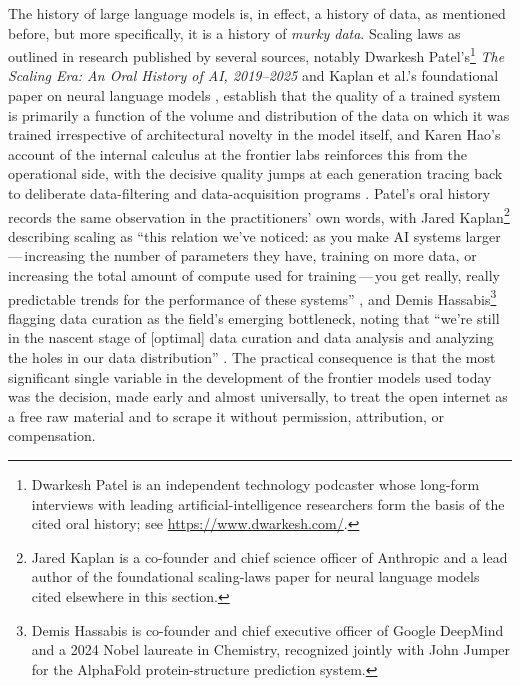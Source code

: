 \documentclass[10pt,a4paper,twocolumn]{article}
\begin{document}
The history of large language models is, in effect, a history of data, as mentioned before, but more specifically, it is a history of \emph{murky data}. Scaling laws as outlined in research published by several sources, notably Dwarkesh Patel's\footnote{Dwarkesh Patel is an independent technology podcaster whose long-form interviews with leading artificial-intelligence researchers form the basis of the cited oral history; see \url{https://www.dwarkesh.com/}.} \emph{The Scaling Era: An Oral History of AI, 2019--2025} \citep{patel2025scaling} and Kaplan et al.'s foundational paper on neural language models \citep{kaplan2020scaling}, establish that the quality of a trained system is primarily a function of the volume and distribution of the data on which it was trained irrespective of architectural novelty in the model itself, and Karen Hao's account of the internal calculus at the frontier labs reinforces this from the operational side, with the decisive quality jumps at each generation tracing back to deliberate data-filtering and data-acquisition programs \citep[pp.~174, 177]{hao2025empire}. Patel's oral history records the same observation in the practitioners' own words, with Jared Kaplan\footnote{Jared Kaplan is a co-founder and chief science officer of Anthropic and a lead author of the foundational scaling-laws paper for neural language models cited elsewhere in this section.} describing scaling as ``this relation we've noticed: as you make AI systems larger\,---\,increasing the number of parameters they have, training on more data, or increasing the total amount of compute used for training\,---\,you get really, really predictable trends for the performance of these systems'' \citep[p.~20]{patel2025scaling}, and Demis Hassabis\footnote{Demis Hassabis is co-founder and chief executive officer of Google DeepMind and a 2024 Nobel laureate in Chemistry, recognized jointly with John Jumper for the AlphaFold protein-structure prediction system.} flagging data curation as the field's emerging bottleneck, noting that ``we're still in the nascent stage of [optimal] data curation and data analysis and analyzing the holes in our data distribution'' \citep[pp.~45--46]{patel2025scaling}. The practical consequence is that the most significant single variable in the development of the frontier models used today was the decision, made early and almost universally, to treat the open internet as a free raw material and to scrape it without permission, attribution, or compensation.
\end{document}
